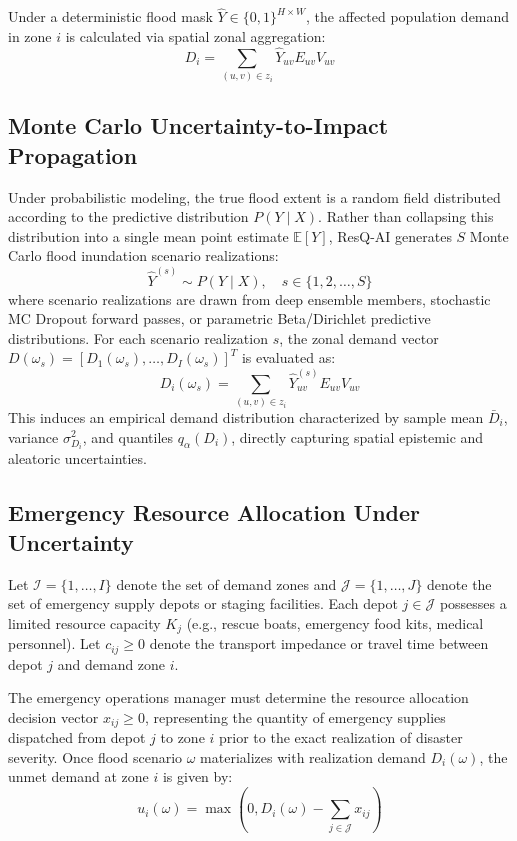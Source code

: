 \documentclass[journal]{IEEEtran}
\begin{document}
Under a deterministic flood mask $\hat{Y} \in \{0, 1\}^{H \times W}$, the affected population demand in zone $i$ is calculated via spatial zonal aggregation:
\begin{equation}
D_i = \sum_{(u,v) \in z_i} \hat{Y}_{uv} E_{uv} V_{uv}
\end{equation}

\subsection{Monte Carlo Uncertainty-to-Impact Propagation}
Under probabilistic modeling, the true flood extent is a random field distributed according to the predictive distribution $P(Y \mid X)$. Rather than collapsing this distribution into a single mean point estimate $\mathbb{E}[Y]$, ResQ-AI generates $S$ Monte Carlo flood inundation scenario realizations:
\begin{equation}
\hat{Y}^{(s)} \sim P(Y \mid X), \quad s \in \{1, 2, \dots, S\}
\end{equation}
where scenario realizations are drawn from deep ensemble members, stochastic MC Dropout forward passes, or parametric Beta/Dirichlet predictive distributions. For each scenario realization $s$, the zonal demand vector $D(\omega_s) = [D_1(\omega_s), \dots, D_I(\omega_s)]^T$ is evaluated as:
\begin{equation}
D_i(\omega_s) = \sum_{(u,v) \in z_i} \hat{Y}_{uv}^{(s)} E_{uv} V_{uv}
\end{equation}
This induces an empirical demand distribution characterized by sample mean $\bar{D}_i$, variance $\sigma_{D_i}^2$, and quantiles $q_\alpha(D_i)$, directly capturing spatial epistemic and aleatoric uncertainties.

\subsection{Emergency Resource Allocation Under Uncertainty}
Let $\mathcal{I} = \{1, \dots, I\}$ denote the set of demand zones and $\mathcal{J} = \{1, \dots, J\}$ denote the set of emergency supply depots or staging facilities. Each depot $j \in \mathcal{J}$ possesses a limited resource capacity $K_j$ (e.g., rescue boats, emergency food kits, medical personnel). Let $c_{ij} \ge 0$ denote the transport impedance or travel time between depot $j$ and demand zone $i$.

The emergency operations manager must determine the resource allocation decision vector $x_{ij} \ge 0$, representing the quantity of emergency supplies dispatched from depot $j$ to zone $i$ prior to the exact realization of disaster severity. Once flood scenario $\omega$ materializes with realization demand $D_i(\omega)$, the unmet demand at zone $i$ is given by:
\begin{equation}
u_i(\omega) = \max\left(0, D_i(\omega) - \sum_{j \in \mathcal{J}} x_{ij}\right)
\end{equation}
\end{document}
